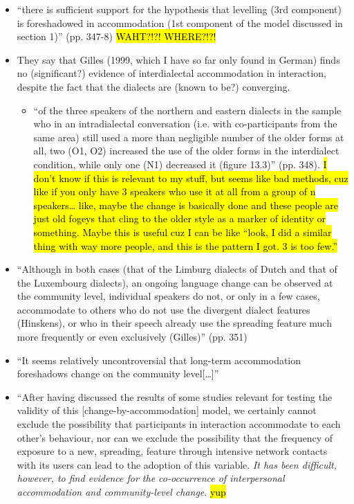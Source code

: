 \begin{itemize}
    \item ``there is sufficient support for the hypothesis that levelling (3rd component) is foreshadowed in accommodation (1st component of the model discussed in section 1)'' (pp. 347-8) \hl{WAHT?!?! WHERE?!?!}
    \item They say that Gilles (1999, which I have so far only found in German) finds no (significant?) evidence of interdialectal accommodation in interaction, despite the fact that the dialects are (known to be?) converging.
    \begin{itemize}
        \item ``of the three speakers of the northern and eastern dialects in the sample who in an intradialectal conversation (i.e. with co-participants from the same area) still used a more than negligible number of the older forms at all, two (O1, O2) increased the use of the older forms in the interdialect condition, while only one (N1) decreased it (figure 13.3)'' (pp. 348). \hl{I don't know if this is relevant to my stuff, but seems like bad methods, cuz like if you only have 3 speakers who use it at all from a group of n speakers\ldots{} like, maybe the change is basically done and these people are just old fogeys that cling to the older style as a marker of identity or something. Maybe this is useful cuz I can be like ``look, I did a similar thing with way more people, and this is the pattern I got. 3 is too few.''}
    \end{itemize}
    \item ``Although in both cases (that of the Limburg dialects of Dutch and that of the Luxembourg dialects), an ongoing language change can be observed at the community level, individual speakers do not, or only in a few cases, accommodate to others who do not use the divergent dialect features (Hinskens), or who in their speech already use the spreading feature much more frequently or even exclusively (Gilles)'' (pp. 351)
    \item ``It seems relatively uncontroversial that long-term accommodation foreshadows change on the community level[\ldots{}]'' 
    \item ``After having discussed the results of some studies relevant for testing the validity of this [change-by-accommodation] model, we certainly cannot exclude the possibility that participants in interaction accommodate to each other’s behaviour, nor can we exclude the possibility that the frequency of exposure to a new, spreading, feature through intensive network contacts with its users can lead to the adoption of this variable. \emph{It has been difficult, however, to find evidence for the co-occurrence of interpersonal accommodation and community-level change}. \hl{yup}

\end{itemize}
